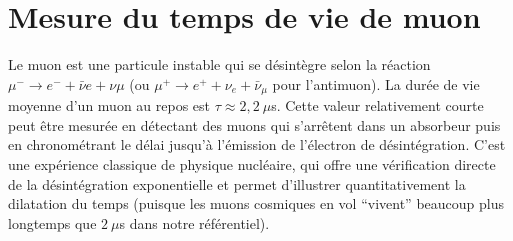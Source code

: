 \documentclass[a4paper,12pt,twoside]{article}
\begin{document}
\section{Mesure du temps de vie de muon}
Le muon est une particule instable qui se désintègre selon la réaction $\mu^- \to e^- + \bar{\nu}e + \nu\mu$ (ou $\mu^+ \to e^+ + \nu_e + \bar{\nu}_\mu$ pour l’antimuon). La durée de vie moyenne d’un muon au repos est $\tau \approx 2,2~\mu$s. Cette valeur relativement courte peut être mesurée en détectant des muons qui s’arrêtent dans un absorbeur puis en chronométrant le délai jusqu’à l’émission de l’électron de désintégration. C’est une expérience classique de physique nucléaire, qui offre une vérification directe de la désintégration exponentielle et permet d’illustrer quantitativement la dilatation du temps (puisque les muons cosmiques en vol “vivent” beaucoup plus longtemps que $2~\mu$s dans notre référentiel).
\end{document}
